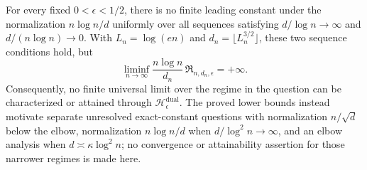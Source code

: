 For every fixed \(0<\epsilon<1/2\), there is no finite leading constant under the normalization \(n\log n/d\) uniformly over all sequences satisfying \(d/\log n\to\infty\) and \(d/(n\log n)\to0\).  With \(L_n=\log(en)\) and \(d_n=\lfloor L_n^{3/2}\rfloor\), these two sequence conditions hold, but
\[
 \liminf_{n\to\infty}
 \frac{n\log n}{d_n}\,
 \mathfrak R_{n,d_n,\epsilon}=+\infty.
\]
Consequently, no finite universal limit over the regime in the question can be characterized or attained through \(\mathscr H_\epsilon^{\mathrm{dual}}\).  The proved lower bounds instead motivate separate unresolved exact-constant questions with normalization \(n/\sqrt d\) below the elbow, normalization \(n\log n/d\) when \(d/\log^2 n\to\infty\), and an elbow analysis when \(d\asymp\kappa\log^2 n\); no convergence or attainability assertion for those narrower regimes is made here.
